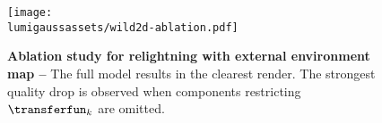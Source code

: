 \begin{figure}[!t]
  \centering
  \texttt{[image: \\lumigaussassets/wild2d-ablation.pdf]}
  \caption{    \textbf{Ablation study for relightning with external environment map --}
    The full model results in the clearest render.
    The strongest quality drop is observed when components restricting
    $\transferfun_k$ are omitted.
  }
  \label{fig:lumigauss-ablation_img}
\end{figure}